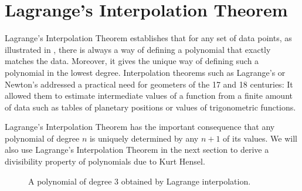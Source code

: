 \section{Lagrange's Interpolation Theorem}

Lagrange's Interpolation Theorem establishes that for any set of data points, as illustrated in , there is always a way of defining a polynomial that exactly matches the data. Moreover, it gives the unique way of defining such a polynomial in the lowest degree. Interpolation theorems such as Lagrange's or Newton's addressed a practical need for geometers of the 17\supth{} and 18\supth{} centuries: It allowed them to estimate intermediate values of a function from a finite amount of data such as tables of planetary positions or values of trigonometric functions.

Lagrange's Interpolation Theorem has the important consequence that any polynomial of degree $n$ is uniquely determined by any $n+1$ of its values. We will also use Lagrange's Interpolation Theorem in the next section to derive a divisibility property of polynomials due to Kurt Hensel.

\begin{figure}[t]
  \centering
  \caption[Example polynomial obtained by Lagrange interpolation]{A polynomial of degree $3$ obtained by Lagrange interpolation.}
  \label{figure:lagrange-interpolation}
\end{figure}

